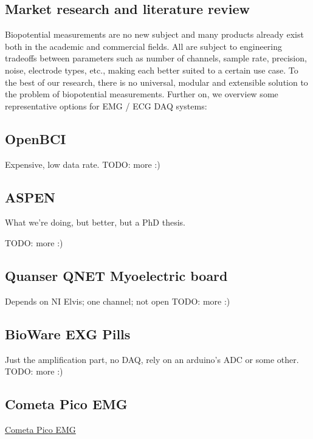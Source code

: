 \documentclass{thesis}
\newcommand{\todo}[1]{{\color{red}TODO: #1}}
\begin{document}
\subsection{Market research and literature review}

Biopotential measurements are no new subject and many products already exist both in the academic and commercial fields. All are subject to engineering tradeoffs between parameters such as number of channels, sample rate, precision, noise, electrode types, etc., making each better suited to a certain use case. To the best of our research, there is no universal, modular and extensible solution to the problem of biopotential measurements. Further on, we overview some representative options for EMG / ECG DAQ systems:

\subsection*{OpenBCI}

Expensive, low data rate. \todo{more :)}

\subsection*{ASPEN}

\cite{Esposito2018}

What we're doing, but better, but a PhD thesis.

\todo{more :)}


\subsection*{Quanser QNET Myoelectric board}



Depends on NI Elvis; one channel; not open \todo{more :)}

\subsection*{BioWare EXG Pills}

Just the amplification part, no DAQ, rely on an arduino's ADC or some other. \todo{more :)}

\subsection*{Cometa Pico EMG}

\href{https://www.cometasystems.com/pico-emg/}{Cometa Pico EMG}
\end{document}
